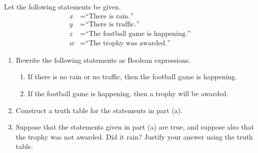 \documentclass{article}
\theoremstyle{definition}
\begin{document}
\begin{question}{10}
	Let the following statements be given.
		\begin{align*}
		x &= \text{``There is rain.''}\\
		y &= \text{``There is traffic.''}\\
		z &= \text{``The football game is happening.''}\\
		w &= \text{``The trophy was awarded.''}
		\end{align*}
	\begin{enumerate}
		\item Rewrite the following statements as Boolean expressions.
			\begin{enumerate}
			\item If there is no rain or no traffic, then the football game is happening.
			\item If the football game is happening, then a trophy will be awarded.
			\end{enumerate}
		\item Construct a truth table for the statements in part (a).
		\item Suppose that the statements given in part (a) are true, and suppose also that the trophy was not awarded. Did it rain? Justify your answer using the truth table.
	\end{enumerate}
\end{question}
\end{document}
